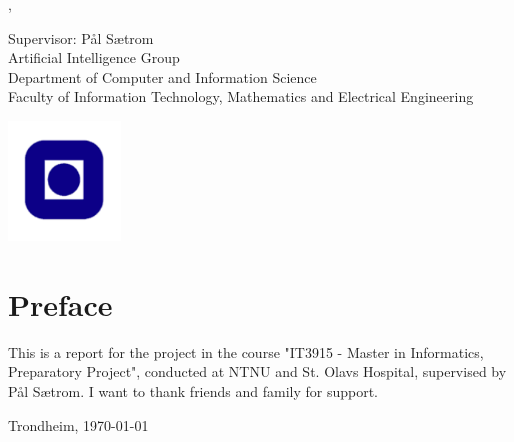\begin{titlepage}
\noindent {\large \textbf{\thesisAuthor}}
\vspace{2cm}

\noindent {\Huge \thesisTitle}
\vspace{2cm}

\noindent \thesisType, \thesisDate 
\vspace{2cm}

\noindent Supervisor: Pål Sætrom\\ Artificial Intelligence Group\\ Department of Computer and Information Science\\ Faculty of Information Technology, Mathematics and Electrical Engineering\\

\vfill
\begin{center}
\includegraphics[width=3cm]{figs/NTNUlogo.pdf}
\end{center}
\end{titlepage}

\thispagestyle{empty}

\cleardoublepage

\frontmatter



\clearpage

\section*{Preface}



\vspace{1cm}

This is a report for the project in the course "IT3915 - Master in Informatics, Preparatory Project", conducted at NTNU and St. Olavs Hospital, supervised by Pål Sætrom. I want to thank friends and family for support.

\vfill

\hfill \thesisAuthor

\hfill Trondheim, \today

\clearpage

\tableofcontents

\listoffigures

\listoftables

